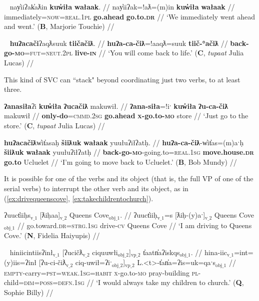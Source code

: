 \ex~ \label{ex:goaheadwent}
\begingl
\glpreamble nay̓iiʔak̓aƛin \textbf{kuw̓iła} \textbf{wałaak}. //
\gla nay̓iiʔak=!aƛ=(m)in \textbf{kuw̓iła} \textbf{wałaak} //
\glb immediately=\textsc{now}=\textsc{real.1pl} \textbf{go.ahead} \textbf{go.to.\textsc{dr}} //
\glft `We immediately went ahead and went.' (\textbf{B}, Marjorie Touchie) //
\endgl
\xe

\ex~ \label{ex:comebacktolife}
\begingl
\glpreamble \textbf{huʔacači}ʔaqƛsuuk \textbf{tiičačiƛ}. //
\gla \textbf{huʔa-ca-čiƛ}=!aaqƛ=suuk \textbf{tiič-°ačiƛ} //
\glb \textbf{back-go-\textsc{mo}}=\textsc{fut}=\textsc{neut.2pl} \textbf{live-\textsc{in}} //
\glft `You will come back to life.' (\textbf{C}, \textit{tupaat} Julia Lucas) //
\endgl
\xe

This kind of SVC can ``stack" beyond coordinating just two verbs, to at least three.

\ex \label{ex:onlygotostore}
\begingl
\glpreamble \textbf{ʔanasiła}ʔi \textbf{kuw̓iła} \textbf{ʔucačiƛ} makuwił. //
\gla \textbf{ʔana-siła}=!iˑ \textbf{kuw̓iła} \textbf{ʔu-ca-čiƛ} makuwił //
\glb \textbf{only-do}=\textsc{cmmd.2sg} \textbf{go.ahead} \textbf{\textsc{x}-go.to-\textsc{mo}} store //
\glft `Just go to the store.' (\textbf{C}, \textit{tupaat} Julia Lucas) //
\endgl
\xe

\ex \label{ex:movebackucluelet}
\begingl
\glpreamble \textbf{huʔacačiƛ}w̓it̓asaḥ \textbf{šiiƛuk} \textbf{wałaak} yuułuʔiłʔatḥ. //
\gla \textbf{huʔa-ca-čiƛ}-w̓it̓as=(m)aˑḥ \textbf{šiiƛuk} \textbf{wałaak} yuułuʔiłʔatḥ //
\glb \textbf{back-go-\textsc{mo}}-going.to=\textsc{real.1sg} \textbf{move.house.\textsc{dr}} \textbf{go.to} Ucluelet //
\glft `I'm going to move back to Ucluelet.' (\textbf{B}, Bob Mundy) //
\endgl
\xe

It is possible for one of the verbs and its object (that is, the full VP of one of the serial verbs) to interrupt the other verb and its object, as in (\ref{ex:drivequeenscove}, \ref{ex:takechildrentochurch}).

\ex \label{ex:drivequeenscove}
\begingl
\glpreamble ʔuuct̓iiḥs$_{\text{v\_1}}$ [ƛiḥaa]$_{\text{v\_2}}$ Queens Cove$_{\text{obj\_1}}$. //
\gla ʔuuct̓iiḥ$_{\text{v\_1}}$=s [ƛiḥ-(y)aˑ]$_{\text{v\_2}}$ Queens Cove$_{\text{obj\_1}}$ //
\glb go.toward.\textsc{dr}=\textsc{strg.1sg} drive-\textsc{cv} Queens Cove //
\glft `I am driving to Queens Cove.' (\textbf{N}, Fidelia Haiyupis) //
\endgl
\xe

\ex~ \label{ex:takechildrentochurch}
\begingl
\glpreamble hiniicintiisʔinł$_{\text{v\_1}}$ [ʔucičƛ$_{\text{v\_2}}$ ciquuwłi$_{\text{obj\_2}}$]$_{\text{vp\_2}}$ t̓aatn̓aʔiskqs$_{\text{obj\_1}}$. //
\gla hina-iic$_{\text{v\_1}}$=int=(y)iis=ʔinł [ʔu-ci-čiƛ$_{\text{v\_2}}$ ciq-uwił=ʔiˑ$_{\text{obj\_2}}$]$_{\text{vp\_2}}$ L.<t>-t̓an̓a=ʔis=uk=qaˑs$_{\text{obj\_1}}$  //
\glb \textsc{empty}-carry=\textsc{pst}=\textsc{weak.1sg}=\textsc{habit} \textsc{x}-go.to-\textsc{mo} pray-building \textsc{pl}-child=\textsc{dim}=\textsc{poss}=\textsc{defn.1sg} //
\glft `I would always take my children to church.' (\textbf{Q}, Sophie Billy) //
\endgl
\xe

